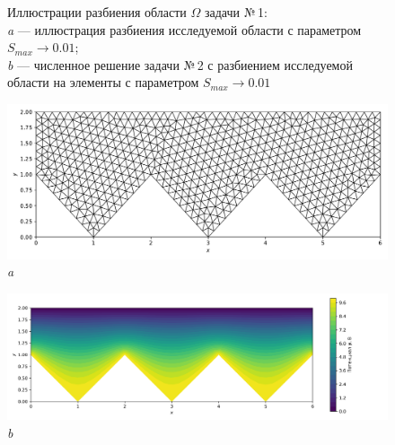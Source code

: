 \documentclass[12pt, a4paper]{article}
\begin{document}
\begin{figure}[h]
\begin{center}
				\end{center} 
				\vspace*{-0.0mm} 
				\caption{Иллюстрации разбиения области $\Omega$ задачи №\,1:\\
					\textit{a} --- иллюстрация разбиения исследуемой области с параметром $S_{max} \rightarrow 0.01$; \\
					\textit{b} --- численное решение задачи №\,2 с разбиением исследуемой области на  элементы с параметром $S_{max} \rightarrow 0.01$ \\
				} 
			\end{figure}
			
						
			\newpage
			
			\begin{figure}[h]       
				\begin{center} 
					{ 
						\begin{minipage}{0.9\textwidth} 
							\centering 
							\hspace*{-8mm}
							\includegraphics[width=0.9\columnwidth]{Test_domain_4_mesh001_3_in_row_calfem_net.pdf}\\ 
							\textit{a} 
						\end{minipage}                                 
					} 
					{ 
						\begin{minipage}{1\textwidth} 
							\centering 
							\hspace*{-15.4mm}
							\includegraphics[width=1.2\columnwidth]{Test_domain_4_mesh001_3_in_row_calfem.png}\\ 
							\textit{b} 
						\end{minipage}                                 
					} 
								

\end{center}
\end{figure}
\end{document}
